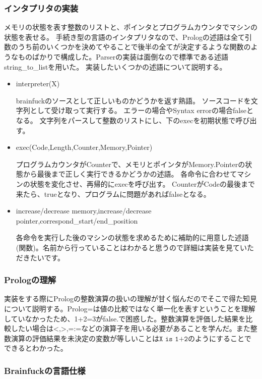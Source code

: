 \documentclass[11pt,a4paper]{jsarticle}
\begin{document}
\subsubsection*{インタプリタの実装}
メモリの状態を表す整数のリストと、ポインタとプログラムカウンタでマシンの状態を表せる。
手続き型の言語のインタプリタなので、Prologの述語は全て引数のうち前のいくつかを決めてやることで後半の全てが決定するような関数のようなものばかりで構成した。Parserの実装は面倒なので標準である述語string\_to\_listを用いた。
実装したいくつかの述語について説明する。
\begin{itemize}
	\item interpreter(X) \par
	brainfuckのソースとして正しいものかどうかを返す熟語。
	ソースコードを文字列として受け取って実行する。
	エラーの場合やSyntax errorの場合falseとなる。
	文字列をパースして整数のリストにし、下のexecを初期状態で呼び出す。
	\item exec(Code,Length,Counter,Memory,Pointer) \par
	プログラムカウンタがCounterで、メモリとポインタがMemory.Pointerの状態から最後まで正しく実行できるかどうかの述語。
	各命令に合わせてマシンの状態を変化させ、再帰的にexecを呼び出す。
	CounterがCodeの最後まで来たら、trueとなり、プログラムに問題があればfalseとなる。
	\item increase/decrease memory,increase/decrease pointer,correspond\_start/end\_position \par
	各命令を実行した後のマシンの状態を求めるために補助的に用意した述語(関数)。名前から行っていることはわかると思うので詳細は実装を見ていただきたいです。
\end{itemize}
\subsubsection*{Prologの理解}
実装をする際にPrologの整数演算の扱いの理解が甘く悩んだのでそこで得た知見について説明する。Prolog=は値の比較ではなく単一化を表すということを理解していなかったため、1+2=3がfalse.で困惑した。整数演算を評価した結果を比較したい場合は$\texttt{<,>,=:=}$などの演算子を用いる必要があることを学んだ。また整数演算の評価結果を未決定の変数が等しいことは$\texttt{X is 1+2}$のようにすることでできるとわかった。
\subsubsection*{Brainfuckの言語仕様}
\end{document}
